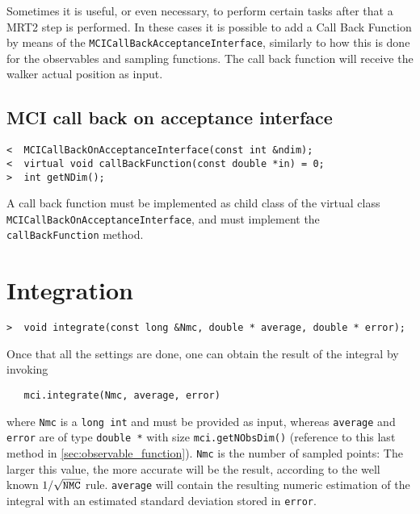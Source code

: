\documentclass[11pt,a4paper,twoside]{article}
\begin{document}
Sometimes it is useful, or even necessary, to perform certain tasks after that a MRT2 step is performed.
In these cases it is possible to add a Call Back Function by means of the \verb+MCICallBackAcceptanceInterface+, similarly to how this is done for the observables and sampling functions.
The call back function will receive the walker actual position as input.


\subsection{MCI call back on acceptance interface}
\label{sub:mci_call_back_on_acceptance_interface}

\begin{verbatim}
<  MCICallBackOnAcceptanceInterface(const int &ndim);
<  virtual void callBackFunction(const double *in) = 0;
>  int getNDim();
\end{verbatim}

A call back function must be implemented as child class of the virtual class \verb+MCICallBackOnAcceptanceInterface+, and must implement the \verb+callBackFunction+ method.







\section{Integration} %
\label{sec:integration}

\begin{verbatim}
>  void integrate(const long &Nmc, double * average, double * error);
\end{verbatim}

Once that all the settings are done, one can obtain the result of the integral by invoking
\begin{verbatim}
   mci.integrate(Nmc, average, error)
\end{verbatim}
where \verb+Nmc+ is a \verb+long int+ and must be provided as input, whereas \verb+average+ and \verb+error+ are of type \verb+double *+ with size \verb+mci.getNObsDim()+ (reference to this last method in \ref{sec:observable_function}).
\verb+Nmc+ is the number of sampled points: The larger this value, the more accurate will be the result, according to the well known $1/\sqrt{\verb+NMC+}$ rule.
\verb+average+ will contain the resulting numeric estimation of the integral with an estimated standard deviation stored in \verb+error+.
\end{document}
